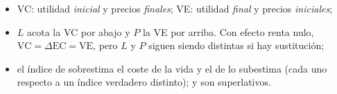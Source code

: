 \documentclass[11pt]{article}
\begin{document}
\begin{itemize}
\begin{itemize}
  \item VC: utilidad \emph{inicial} y precios \emph{finales}; VE: utilidad \emph{final} y precios \emph{iniciales};
  \item $L$ acota la VC por abajo y $P$ la VE por arriba. Con efecto renta nulo, $\mathrm{VC}=\Delta\mathrm{EC}=\mathrm{VE}$, pero $L$ y $P$ siguen siendo distintas si hay sustitución;
  \item el índice de  sobrestima el coste de la vida y el de  lo subestima (cada uno respecto a un índice verdadero distinto);  y  son superlativos.
  \end{itemize}
\end{itemize}

\bibliografia
\end{document}
